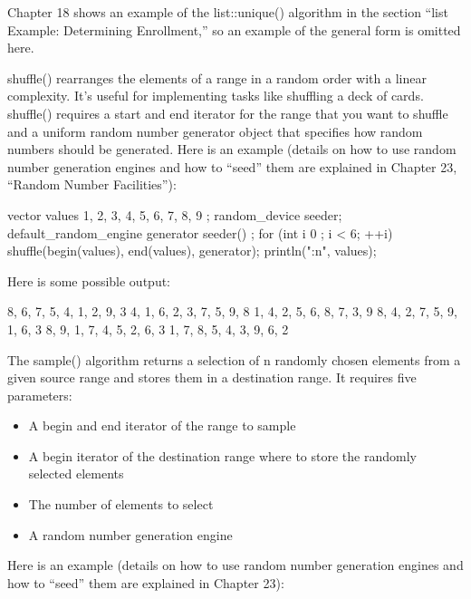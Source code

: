Chapter 18 shows an example of the list::unique() algorithm in the section “list Example: Determining Enrollment,” so an example of the general form is omitted here.


shuffle() rearranges the elements of a range in a random order with a linear complexity. It’s useful for implementing tasks like shuffling a deck of cards. shuffle() requires a start and end iterator for the range that you want to shuffle and a uniform random number generator object that specifies how random numbers should be generated. Here is an example (details on how to use random number generation engines and how to “seed” them are explained in Chapter 23, “Random Number Facilities”):

\begin{cpp}
vector values { 1, 2, 3, 4, 5, 6, 7, 8, 9 };
random_device seeder;
default_random_engine generator { seeder() };
for (int i { 0 }; i < 6; ++i) {
    shuffle(begin(values), end(values), generator);
    println("{:n}", values);
}
\end{cpp}

Here is some possible output:

\begin{shell}
8, 6, 7, 5, 4, 1, 2, 9, 3
4, 1, 6, 2, 3, 7, 5, 9, 8
1, 4, 2, 5, 6, 8, 7, 3, 9
8, 4, 2, 7, 5, 9, 1, 6, 3
8, 9, 1, 7, 4, 5, 2, 6, 3
1, 7, 8, 5, 4, 3, 9, 6, 2
\end{shell}



The sample() algorithm returns a selection of n randomly chosen elements from a given source range and stores them in a destination range. It requires five parameters:

\begin{itemize}
\item
A begin and end iterator of the range to sample

\item
A begin iterator of the destination range where to store the randomly selected elements

\item
The number of elements to select

\item
A random number generation engine
\end{itemize}

Here is an example (details on how to use random number generation engines and how to “seed” them are explained in Chapter 23):

